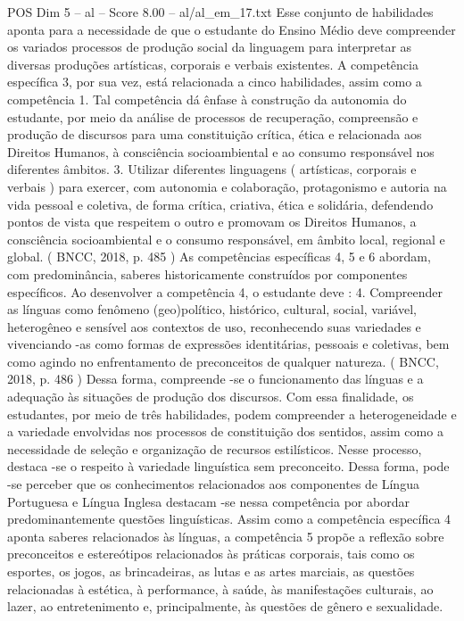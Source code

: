 \begin{textsample}{POS Dim 5 – al – Score 8.00 – al/al\_em\_17.txt}
Esse conjunto de habilidades aponta para a necessidade de que o estudante do Ensino Médio deve compreender os variados processos de produção social da linguagem para interpretar as diversas produções artísticas, corporais e verbais existentes.
A competência específica 3, por sua vez, está relacionada a cinco habilidades, assim como a competência 1.
Tal competência dá ênfase à construção da autonomia do estudante, por meio da análise de processos de recuperação, compreensão e produção de discursos para uma constituição crítica, ética e relacionada aos Direitos Humanos, à consciência socioambiental e ao consumo responsável nos diferentes âmbitos. 3.
Utilizar diferentes linguagens ( artísticas, corporais e verbais ) para exercer, com autonomia e colaboração, protagonismo e autoria na vida pessoal e coletiva, de forma crítica, criativa, ética e solidária, defendendo pontos de vista que respeitem o outro e promovam os Direitos Humanos, a consciência socioambiental e o consumo responsável, em âmbito local, regional e global. ( BNCC, 2018, p. 485 ) As competências específicas 4, 5 e 6 abordam, com predominância, saberes historicamente construídos por componentes específicos.
Ao desenvolver a competência 4, o estudante deve : 4.
Compreender as línguas como fenômeno (geo)político, histórico, cultural, social, variável, heterogêneo e sensível aos contextos de uso, reconhecendo suas variedades e vivenciando -as como formas de expressões identitárias, pessoais e coletivas, bem como agindo no enfrentamento de preconceitos de qualquer natureza. ( BNCC, 2018, p. 486 ) Dessa forma, compreende -se o funcionamento das línguas e a adequação às situações de produção dos discursos.
Com essa finalidade, os estudantes, por meio de três habilidades, podem compreender a heterogeneidade e a variedade envolvidas nos processos de constituição dos sentidos, assim como a necessidade de seleção e organização de recursos estilísticos.
Nesse processo, destaca -se o respeito à variedade linguística sem preconceito.
Dessa forma, pode -se perceber que os conhecimentos relacionados aos componentes de Língua Portuguesa e Língua Inglesa destacam -se nessa competência por abordar predominantemente questões linguísticas.
Assim como a competência específica 4 aponta saberes relacionados às línguas, a competência 5 propõe a reflexão sobre preconceitos e estereótipos relacionados às práticas corporais, tais como os esportes, os jogos, as brincadeiras, as lutas e as artes marciais, as questões relacionadas à estética, à performance, à saúde, às manifestações culturais, ao lazer, ao entretenimento e, principalmente, às questões de gênero e sexualidade.

\end{textsample}
